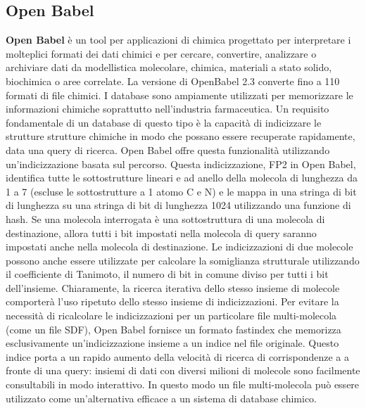 \subsection{Open Babel}
\textbf{Open Babel} è un tool per applicazioni di chimica progettato per interpretare i molteplici formati dei dati chimici e per cercare, convertire, analizzare o archiviare dati da modellistica molecolare, chimica, materiali a stato solido, biochimica o aree correlate.\newline
La versione di OpenBabel 2.3 converte fino a 110 formati di file chimici.\newline
I database sono ampiamente utilizzati per memorizzare le informazioni chimiche soprattutto nell'industria farmaceutica. Un requisito fondamentale di un database di questo tipo è la capacità di indicizzare le strutture strutture chimiche in modo che possano essere recuperate rapidamente, data una query di ricerca. Open Babel offre questa funzionalità utilizzando un'indicizzazione basata sul percorso. Questa indicizzazione, FP2 in Open Babel, identifica tutte le sottostrutture lineari e ad anello della molecola di lunghezza da 1 a 7 (escluse le sottostrutture a 1 atomo C e N) e le mappa in una stringa di bit di lunghezza su una stringa di bit di lunghezza 1024 utilizzando una funzione di hash. Se una molecola interrogata è una sottostruttura di una molecola di destinazione, allora tutti i bit impostati nella molecola di query saranno impostati anche nella molecola di destinazione. Le indicizzazioni
di due molecole possono anche essere utilizzate per calcolare la somiglianza strutturale utilizzando il coefficiente di Tanimoto, il numero di bit in comune diviso per tutti i bit dell'insieme.\newline
Chiaramente, la ricerca iterativa dello stesso insieme di molecole comporterà l'uso ripetuto dello stesso insieme di indicizzazioni. Per evitare la necessità di ricalcolare le indicizzazioni per un particolare file multi-molecola (come un file SDF), Open Babel fornisce un formato fastindex che memorizza esclusivamente un'indicizzazione insieme a un indice nel file originale. Questo indice porta a un rapido aumento della velocità di ricerca di corrispondenze a a fronte di una query: insiemi di dati con diversi milioni di molecole sono facilmente consultabili in modo interattivo. In questo modo un file multi-molecola può essere utilizzato come un'alternativa efficace a un sistema di database chimico\cite{o2011open}.

